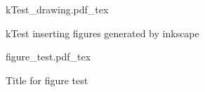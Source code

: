 \documentclass[12pt]{article}
\newcommand{\incfig}[1]{%
    \def\svgwidth{\columnwidth}
    {#1.pdf_tex}
}
\begin{document}

\begin{figure}[H]
    \centering
    \incfig{kTest_drawing}
    \caption{kTest inserting figures generated by inkscape}
    \label{fig:kTest_drawing}
\end{figure}

\begin{figure}[H]
    \centering
    \incfig{figure_test}
    \caption{Title for figure test}
    \label{fig:figure_test}
\end{figure}
\end{document}
